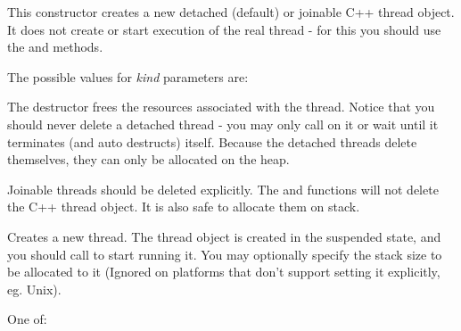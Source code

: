 
\label{wxthreadctor}


This constructor creates a new detached (default) or joinable C++ thread object. It
does not create or start execution of the real thread - for this you should
use the  and  methods.

The possible values for {\it kind} parameters are:

\twocolwidtha{7cm}
\begin{twocollist}\itemsep=0pt
\end{twocollist}



The destructor frees the resources associated with the thread. Notice that you
should never delete a detached thread - you may only call
 on it or wait until it terminates (and auto
destructs) itself. Because the detached threads delete themselves, they can
only be allocated on the heap.

Joinable threads should be deleted explicitly. The  and  functions
will not delete the C++ thread object. It is also safe to allocate them on
stack.

\label{wxthreadcreate}


Creates a new thread. The thread object is created in the suspended state, and you
should call  to start running it.  You may optionally
specify the stack size to be allocated to it (Ignored on platforms that don't
support setting it explicitly, eg. Unix).


One of:

\twocolwidtha{7cm}
\begin{twocollist}\itemsep=0pt
\end{twocollist}

